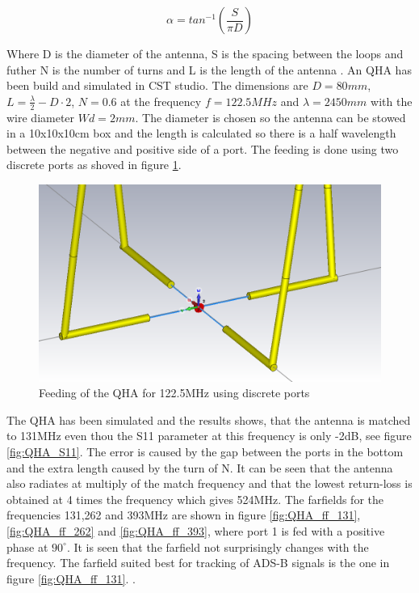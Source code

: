 \begin{equation}
\alpha = tan^{-1}(\frac{S}{\pi D})
\end{equation}
\label{eq:pitch}

Where D is the diameter of the antenna, S is the spacing between the loops and futher N is the number of turns and L is the length of the antenna \citep{Balanis2005}.
\newline
\newline
An QHA has been build and simulated in CST studio. The dimensions are $D=80mm$,$L=\frac{\lambda}{2}-D\cdot 2$, $N=0.6$ at the frequency $f=122.5MHz$ and $\lambda = 2450mm$ with the wire diameter $Wd = 2mm$. The diameter is chosen so the antenna can be stowed in a 10x10x10cm box and the length is calculated so there is a half wavelength between the negative and positive side of a port. The feeding is done using two discrete ports as shoved in figure \ref{fig:QHA2}.  

\begin{figure}[H]
\centering 
\includegraphics[scale = 0.4]{figures/antennas/qha/qha_6_feeding}
\caption{Feeding of the QHA for 122.5MHz using discrete ports}
\label{fig:QHA2}
\end{figure}
 
The QHA has been simulated and the results shows, that the antenna is matched to 131MHz even thou the S11 parameter at this frequency is only -2dB, see figure \ref{fig:QHA_S11}. The error is caused by the gap between the ports in the bottom and the extra length caused by the turn of N. It can be seen that the antenna also radiates at multiply of the match frequency and that the lowest return-loss is obtained at 4 times the frequency which gives 524MHz. The farfields for the frequencies 131,262 and 393MHz are shown in figure \ref{fig:QHA_ff_131}, \ref{fig:QHA_ff_262} and \ref{fig:QHA_ff_393}, where port 1 is fed with a positive phase at $90^\circ$. It is seen that the farfield not surprisingly changes with the frequency. The farfield suited best for tracking of ADS-B signals is the one in figure \ref{fig:QHA_ff_131}. .      

